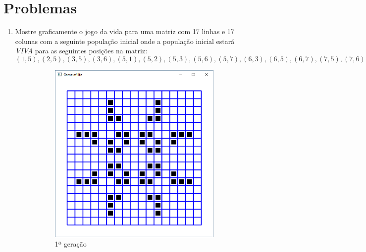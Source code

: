 \section*{Problemas}
\begin{enumerate}
\item
  Mostre graficamente o jogo da vida para uma matriz com 17 linhas e 17 colunas com a seguinte população inicial onde a população inicial estará \emph{VIVA} para as seguintes posições na matriz:
  $$
    (1,5), (2,5), (3,5), (3,6), (5,1), (5,2), (5,3), (5,6), (5,7), (6,3), (6,5), (6,7), (7,5), (7,6)
  $$
  \label{ex:cap02_ex2}

     \begin{figure}[!htp]
    \centering
    \begin{subfigure}[b]{0.3\textwidth}
        \centerline{\includegraphics[width=.9\textwidth]{img/cap2_ex9.png}}
        \caption{1ª geração}
        \label{fig:cap03_ex9a}
    \end{subfigure}
    ~
    \begin{subfigure}[b]{0.3\textwidth}

\end{subfigure}
\end{figure}
\end{enumerate}
